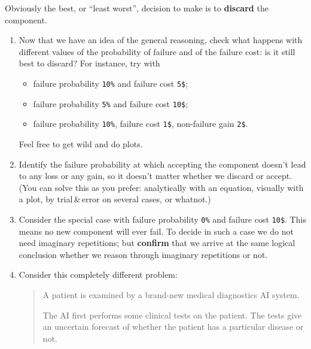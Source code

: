 \documentclass[
  a4paper,
  DIV=11,
  numbers=noendperiod,
  oneside]{scrreprt}
\providecommand{\tightlist}{%
  \setlength{\itemsep}{0pt}\setlength{\parskip}{0pt}}\usepackage{longtable,booktabs,array}
\begin{document}
Obviously the best, or ``least worst'', decision to make is to
\textbf{discard} the component.

\begin{tcolorbox}[enhanced jigsaw, opacitybacktitle=0.6, bottomrule=.15mm, opacityback=0, toprule=.15mm, breakable, colframe=quarto-callout-caution-color-frame, titlerule=0mm, toptitle=1mm, rightrule=.15mm, leftrule=.75mm, bottomtitle=1mm, coltitle=black, colbacktitle=quarto-callout-caution-color!10!white, title={\faIcon{pen} Exercises}, arc=.35mm, left=2mm, colback=white]

\begin{enumerate}
\def\labelenumi{\arabic{enumi}.}
\item
  Now that we have an idea of the general reasoning, check what happens
  with different values of the probability of failure and of the failure
  cost: is it still best to discard? For instance, try with

  \begin{itemize}
  \tightlist
  \item
    failure probability \texttt{10\%} and failure cost \texttt{5\$};
  \item
    failure probability \texttt{5\%} and failure cost \texttt{10\$};
  \item
    failure probability \texttt{10\%}, failure cost \texttt{1\$},
    non-failure gain \texttt{2\$}.
  \end{itemize}

  Feel free to get wild and do plots.
\item
  Identify the failure probability at which accepting the component
  doesn't lead to any loss or any gain, so it doesn't matter whether we
  discard or accept. (You can solve this as you prefer: analytically
  with an equation, visually with a plot, by trial\,\&\,error on several
  cases, or whatnot.)
\item
  Consider the special case with failure probability \texttt{0\%} and
  failure cost \texttt{10\$}. This means no new component will ever
  fail. To decide in such a case we do not need imaginary repetitions;
  but \textbf{confirm} that we arrive at the same logical conclusion
  whether we reason through imaginary repetitions or not.
\item
  Consider this completely different problem:

  \begin{quote}
  A patient is examined by a brand-new medical diagnostics AI system.

  The AI first performs some clinical tests on the patient. The tests
  give an uncertain forecast of whether the patient has a particular
  disease or not.


\end{quote}
\end{enumerate}
\end{tcolorbox}
\end{document}
